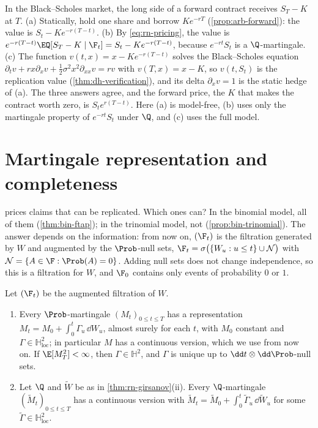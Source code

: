 \begin{example}\label{exa:rn-forward}
In the Black--Scholes market, the long side of a forward contract receives $S_T-K$ at $T$.
(a) Statically, hold one share and borrow $Ke^{-rT}$ (\cref{prop:arb-forward}): the value is
$S_t-Ke^{-r(T-t)}$. (b) By \eqref{eq:rn-pricing}, the value is
$e^{-r(T-t)}\EQ[S_T-K\mid\F_t]=S_t-Ke^{-r(T-t)}$, because $e^{-rt}S_t$ is a $\Q$-martingale.
(c) The function $v(t,x)=x-Ke^{-r(T-t)}$ solves the Black--Scholes equation
$\partial_tv+rx\partial_xv+\frac12\sigma^2x^2\partial_{xx}v=rv$ with $v(T,x)=x-K$, so
$v(t,S_t)$ is the replication value (\cref{thm:dh-verification}), and its delta
$\partial_xv=1$ is the static hedge of (a). The three
answers agree, and the forward price, the $K$ that makes the contract worth zero, is
$S_te^{r(T-t)}$. Here (a) is model-free, (b) uses only the martingale property of
$e^{-rt}S_t$ under $\Q$, and (c) uses the full model.
\end{example}

\section{Martingale representation and completeness}\label{sec:rn-complete}

 prices claims that can be replicated. Which ones can? In the binomial
model, all of them (\cref{thm:bin-ftap}); in the trinomial model, not
(\cref{prop:bin-trinomial}). The answer depends on the information: from now on, $(\F_t)$ is
the filtration generated by $W$ and augmented by the $\Prob$-null sets,
$\F_t=\sigma\big(\{W_u:u\le t\}\cup\mathcal N\big)$ with $\mathcal N=\{A\in\F:\Prob(A)=0\}$.
Adding null sets does not change independence, so this is a filtration for $W$, and $\F_0$
contains only events of probability $0$ or $1$.

\begin{theorem}\label{thm:rn-representation}
Let $(\F_t)$ be the augmented filtration of $W$.
\begin{enumerate}[label=(\roman*)]
  \item Every $\Prob$-martingale $(M_t)_{0\le t\le T}$ has a representation
    $M_t=M_0+\int_0^t\Gamma_u\,\dd W_u$, almost surely for each $t$, with $M_0$ constant and
    $\Gamma\in\mathbb H^2_{\mathrm{loc}}$; in particular $M$ has a continuous version, which
    we use from now on. If $\E[M_T^2]<\infty$, then $\Gamma\in\mathbb H^2$, and $\Gamma$ is
    unique up to $\dd t\otimes\dd\Prob$-null sets.
  \item Let $\Q$ and $\widetilde W$ be as in \cref{thm:rn-girsanov}(ii). Every
    $\Q$-martingale $(\widetilde M_t)_{0\le t\le T}$ has a continuous version with
    $\widetilde M_t=\widetilde M_0+\int_0^t\widetilde\Gamma_u\,\dd\widetilde W_u$ for some
    $\widetilde\Gamma\in\mathbb H^2_{\mathrm{loc}}$.
\end{enumerate}
\end{theorem}

